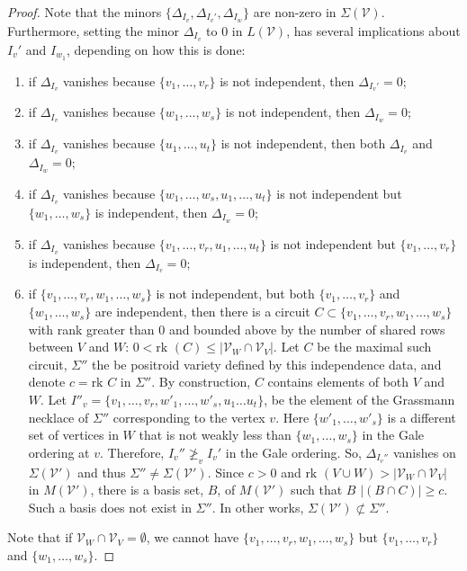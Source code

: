 \documentclass[11pt]{article}
\newcommand{\rk}{\textrm{rk }}
\newcommand{\cV}{\mathcal{V}}
\theoremstyle{remark}
\theoremstyle{definition}
\begin{document}
\begin{proof}
Note that the minors $\{\Delta_{I_v}, \Delta_{I_v'}, \Delta_{I_w}\}$ are non-zero in $\Sigma(\cV)$. Furthermore, setting the minor $\Delta_{I_v}$ to $0$ in $L(\cV)$, has several implications about $I_v'$ and $I_{w_1}$, depending on how this is done: 
\begin{enumerate} 
\item if $\Delta_{I_v}$ vanishes because $\{v_1, \ldots, v_r\}$ is not independent, then $\Delta_{I_v'} = 0$; 
\item if $\Delta_{I_v}$ vanishes because $\{w_1, \ldots, w_s\}$ is not independent, then $\Delta_{I_w} = 0$;
\item if $\Delta_{I_v}$ vanishes because $\{u_1, \ldots, u_t\}$ is not independent, then both $\Delta_{I_v}$ and $\Delta_{I_w} = 0$;
\item if $\Delta_{I_v}$ vanishes because $\{w_1, \ldots, w_s, u_1, \ldots, u_t\}$ is not independent but $\{w_1, \ldots, w_s\}$ is independent, then $\Delta_{I_w} = 0$;
\item if $\Delta_{I_v}$ vanishes because $\{v_1, \ldots, v_r, u_1, \ldots, u_t\}$ is not independent but $\{v_1, \ldots, v_r\}$ is independent, then $\Delta_{I_v} = 0$;
\item if $\{v_1, \ldots, v_r, w_1, \ldots, w_s\}$ is not independent, but both $\{v_1, \ldots, v_r\}$ and $\{w_1, \ldots, w_s\}$ are independent, then there is a circuit $C \subset \{v_1, \ldots, v_r, w_1, \ldots, w_s\}$ with rank greater than $0$ and bounded above by the number of shared rows between $V$ and $W$: $0 < \rk(C) \leq |\cV_W \cap \cV_V|$. Let $C$ be the maximal such circuit, $\Sigma''$ the be positroid variety defined by this independence data, and denote $c = \rk C$ in $\Sigma''$. By construction, $C$ contains elements of both $V$ and $W$. Let $I''_v = \{v_1, \ldots, v_r, w'_1, \ldots, w'_s, u_1 \ldots u_t\}$, be the element of the Grassmann necklace of $\Sigma''$ corresponding to the vertex $v$. Here $\{w'_1, \ldots, w'_s\}$ is a different set of vertices in $W$ that is not weakly less than $\{w_1, \ldots, w_s\}$ in the Gale ordering at $v$. Therefore, $I_v'' \ngeq_v I_v'$ in the Gale ordering. So, $\Delta_{I_v''}$ vanishes on $\Sigma(\cV')$ and thus $\Sigma'' \neq \Sigma(\cV')$. Since $c > 0$ and $\rk (V\cup W) > |\cV_W \cap \cV_V|$ in $M(\cV')$,  there is a basis set, $B$, of $M(\cV')$ such that $B$ $|(B \cap C)| \geq c$. Such a basis does not exist in $\Sigma''$. In other works, $\Sigma(\cV') \not \subset \Sigma''$.
\end{enumerate}

Note that if $\cV_W \cap \cV_V = \emptyset$, we cannot have $\{v_1, \ldots, v_r, w_1, \ldots, w_s\}$ but $\{v_1, \ldots, v_r\}$ and $\{w_1, \ldots, w_s\}$.


\end{proof}
\end{document}
